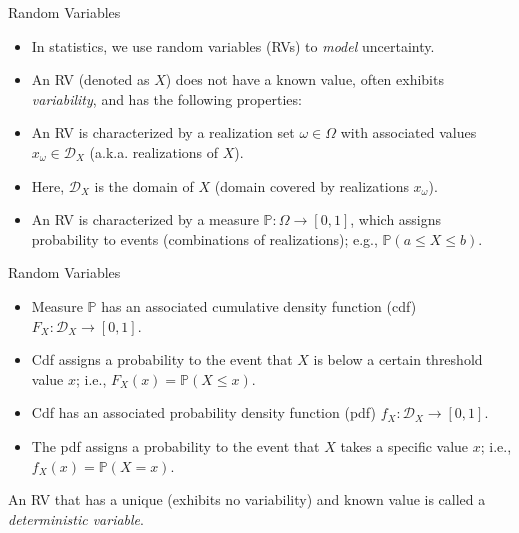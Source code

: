 \documentclass[9pt]{beamer}
\begin{document}
\begin{frame}{Random Variables}
\begin{itemize}
 \setlength{\itemsep}{5pt}
\item In statistics, we use random variables (RVs) to {\em model} uncertainty. 

\item An RV (denoted as $X$) does not have a known value, often exhibits {\em variability}, and has the following properties: 
\end{itemize}
\begin{block}{}
\begin{itemize}
 \setlength{\itemsep}{10pt}
\item An RV is characterized by a realization set $\omega \in \Omega$ with associated values $x_\omega\in \mathcal{D}_X$ (a.k.a. realizations of $X$).  

\item Here, $\mathcal{D}_X$ is the domain of $X$ (domain covered by realizations $x_\omega$).

\item An RV is characterized by a measure $\mathbb{P}:\Omega\to [0,1]$, which assigns probability to events (combinations of realizations); e.g., $\mathbb{P}(a\leq X\leq b)$.
\end{itemize}
\end{block}
\end{frame}

\begin{frame}{Random Variables}
\begin{block}{}
\begin{itemize}
 \setlength{\itemsep}{10pt}
\item Measure $\mathbb{P}$ has an associated cumulative density function (cdf) $F_X:\mathcal{D}_X\to [0,1]$. 

\item Cdf assigns a probability to the event that $X$ is below a certain threshold value $x$; i.e., $F_X(x)=\mathbb{P}(X\leq x)$.
\item Cdf has an associated probability density function (pdf) $f_X:\mathcal{D}_X\to [0,1]$. 

\item The pdf assigns a probability to the event that $X$ takes a specific value $x$; i.e., $f_X(x)=\mathbb{P}(X=x)$.  
\end{itemize}
\end{block}
An RV that has a unique (exhibits no variability) and known value is called a {\em deterministic variable}. 
\end{frame}
\end{document}
